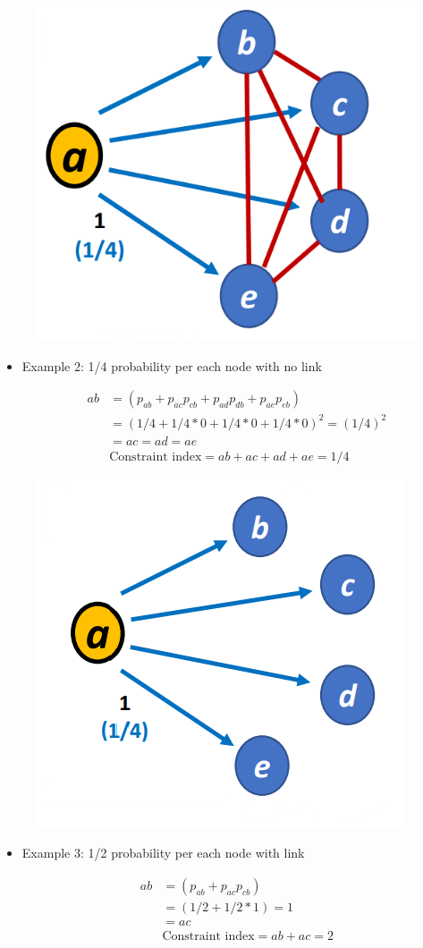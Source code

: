 \documentclass[
  notitlepage,
  onecolumn,
  openany]{book}
\begin{document}
\begin{figure}[h!]

{\centering \includegraphics[width=0.4\linewidth]{images/08-Metrics for structural holes/Untitled} 

}

\end{figure}

\begin{itemize}
\item
  Example 2: 1/4 probability per each node with no link

  \[
    \begin{aligned}
    ab &= (p_{ab}+p_{ac}p_{cb}+p_{ad}p_{db}+p_{ae}p_{eb})
    \\&= (1/4+1/4*0+1/4*0+1/4*0)^2 =(1/4)^2 \\
    & = ac = ad = ae\\
    &\text{Constraint index} = ab+ac+ad+ae = 1/4
    \end{aligned}
    \]
\end{itemize}

\begin{figure}[h!]

{\centering \includegraphics[width=0.4\linewidth]{images/08-Metrics for structural holes/Untitled 1} 

}

\end{figure}

\begin{itemize}
\item
  Example 3: 1/2 probability per each node with link

  \[
    \begin{aligned}
    ab &= (p_{ab}+p_{ac}p_{cb})
    \\&= (1/2+1/2*1)=1\\
    & = ac\\
    &\text{Constraint index} = ab+ac= 2
    \end{aligned}
    \]
\end{itemize}
\end{document}
